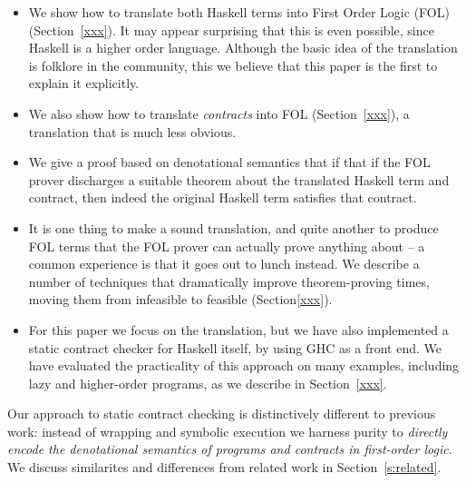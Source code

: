\begin{itemize}
\item We show how to translate both Haskell terms
into First Order Logic (FOL) (Section~\ref{xxx}).  It may appear surprising that this 
is even possible, since Haskell is a higher order language.  Although
the basic idea of the translation is folklore in the community,
this we believe that this paper is the first to explain it explicitly.

\item We also show how to translate \emph{contracts} into FOL
      (Section~\ref{xxx}), a translation that is much less obvious.

\item We give a proof based on denotational semantics 
that if that if the FOL prover discharges a 
suitable theorem about the translated Haskell term and contract, 
then indeed the original Haskell term satisfies that contract.

\item It is one thing to make a sound translation, and quite another
to produce FOL terms that the FOL prover can actually prove anything
about -- a common experience is that it goes out to lunch instead.  We
describe a number of techniques that dramatically improve
theorem-proving times, moving them from infeasible to feasible (Section\ref{xxx}).

\item For this paper we focus on the
translation, but we have also implemented a static contract checker
for Haskell itself, by using GHC as a front end.  We have evaluated
the practicality of this approach on many examples, including lazy and
higher-order programs, as we describe in Section~\ref{xxx}.  
\end{itemize}
Our approach to static contract checking is distinctively different to
previous work: instead of wrapping and symbolic execution we harness
purity to \emph{directly encode the denotational semantics of programs
and contracts in first-order logic}.  We discuss similarites and differences from
related work in Section~\ref{s:related}.



















